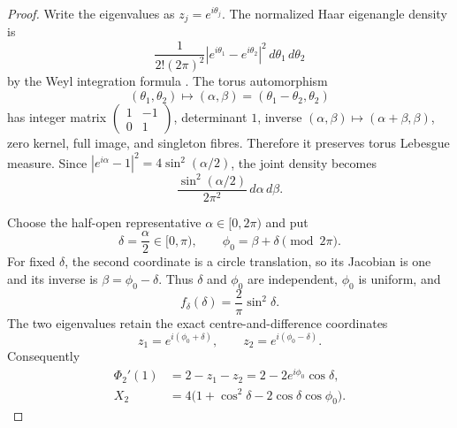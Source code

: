 \begin{proof}
Write the eigenvalues as $z_j=e^{i\theta_j}$.  The normalized Haar eigenangle density is
\begin{equation}
 \frac{1}{2!(2\pi)^2}
 |e^{i\theta_1}-e^{i\theta_2}|^2\,d\theta_1\,d\theta_2
 \label{eq:u2-haar-density}
\end{equation}
by the Weyl integration formula \cite[eq.~(1.3)]{forrester2022}.  The torus automorphism
\[
 (\theta_1,\theta_2)\longmapsto
 (\alpha,\beta)=(\theta_1-\theta_2,\theta_2)
\]
has integer matrix $\left(\begin{smallmatrix}1&-1\\0&1\end{smallmatrix}\right)$, determinant
$1$, inverse $(\alpha,\beta)\mapsto(\alpha+\beta,\beta)$, zero kernel, full image, and
singleton fibres.  Therefore it preserves torus Lebesgue measure.  Since
$|e^{i\alpha}-1|^2=4\sin^2(\alpha/2)$, the joint density becomes
\[
 \frac{\sin^2(\alpha/2)}{2\pi^2}\,d\alpha\,d\beta.
\]

Choose the half-open representative $\alpha\in[0,2\pi)$ and put
\[
 \delta=\frac{\alpha}{2}\in[0,\pi),
 \qquad
 \phi_0=\beta+\delta\pmod{2\pi}.
\]
For fixed $\delta$, the second coordinate is a circle translation, so its Jacobian is one and
its inverse is $\beta=\phi_0-\delta$.  Thus $\delta$ and $\phi_0$ are independent, $\phi_0$
is uniform, and
\begin{equation}
 f_\delta(\delta)=\frac2\pi\sin^2\delta.
 \label{eq:u2-delta-density}
\end{equation}
The two eigenvalues retain the exact centre-and-difference coordinates
\[
 z_1=e^{i(\phi_0+\delta)},
 \qquad
 z_2=e^{i(\phi_0-\delta)}.
\]
Consequently
\begin{align}
 \Phi_2'(1)&=2-z_1-z_2=2-2e^{i\phi_0}\cos\delta,\\
 X_2&=4\bigl(1+\cos^2\delta-2\cos\delta\cos\phi_0\bigr).
 \label{eq:u2-centre-difference-law}
\end{align}


\end{proof}
